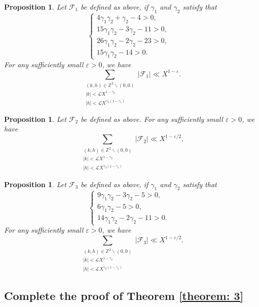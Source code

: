 \documentclass[12pt, reqno, twoside, letterpaper]{amsart}
\numberwithin{equation}{section}
\newcommand{\cF}{\ensuremath{\mathcal{F}}}
\newcommand{\cL}{\ensuremath{\mathcal{L}}}
\newcommand{\ZZ}{\ensuremath{\mathbb{Z}}}
\theoremstyle{customthm}
\newtheorem{proposition}[X]{Proposition}
\theoremstyle{customrem}
\begin{document}
\begin{proposition}\label{F1}
Let $\cF_1$ be defined as above, if $\gamma_1$ and $\gamma_2$ satisfy that
$$
\left\{\begin{array}{ll}
4\gamma_1\gamma_2+\gamma_2-4>0, & \\
15\gamma_1\gamma_2-3\gamma_2-11>0, &\\
26\gamma_1\gamma_2-2\gamma_2-23>0, & \\
			15\gamma_1\gamma_2-14>0.
\end{array}\right.
$$
For any sufficiently small $\varepsilon>0$, we have
$$
\sum_{\substack{(k,h) \in \ZZ^2 \backslash (0,0) \\ |k|<\cL X^{1-\gamma_2} \\ |h|<\cL X^{\gamma_2(1-\gamma_1)}}}|\cF_1| \ll X^{1-\varepsilon}.
$$
\end{proposition}

\begin{proposition}\label{F2}
Let $\cF_2$ be defined as above. For any sufficiently small $\varepsilon>0$, we have
$$
\sum_{\substack{(k,h) \in \ZZ^2 \backslash (0,0) \\ |k|<\cL X^{1-\gamma_2} \\ |h|<\cL X^{\gamma_2(1-\gamma_1)}}}|\cF_2| \ll X^{1-\varepsilon/2}.
$$
\end{proposition}

\begin{proposition}\label{F3}
Let $\cF_3$ be defined as above, if $\gamma_1$ and $\gamma_2$ satisfy that
$$
\left\{\begin{array}{ll}
	9\gamma_1\gamma_2-3\gamma_2-5>0, & \\
	6\gamma_1\gamma_2-5>0, & \\
	14\gamma_1\gamma_2-2\gamma_2-11>0. &
\end{array}\right.
$$
For any sufficiently small $\varepsilon>0$, we have
$$
\sum_{\substack{(k,h) \in \ZZ^2 \backslash (0,0) \\ |k|<\cL X^{1-\gamma_2} \\ |h|<\cL X^{\gamma_2(1-\gamma_1)}}}|\cF_3| \ll X^{1-\varepsilon/2}.
$$
\end{proposition}

\subsection{Complete the proof of Theorem \ref{theorem: 3}}
\end{document}
